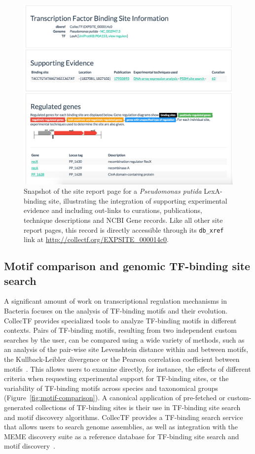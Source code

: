\begin{figure}
  \centering
  \includegraphics[width=\textwidth]{figures/chapter2/individual-site}
  \caption{Snapshot of the site report page for a \textit{Pseudomonas putida}
    LexA-binding site, illustrating the integration of supporting experimental
    evidence and including out-links to curations, publications, technique
    descriptions and NCBI Gene records. Like all other site report pages, this
    record is directly accessible through its \texttt{db\_xref} link at
    \url{http://collectf.org/EXPSITE_000014c0}.}
\label{fig:individual-site}
\end{figure}

\subsection{Motif comparison and genomic TF-binding site search}

A significant amount of work on transcriptional regulation mechanisms in
Bacteria focuses on the analysis of TF-binding motifs and their
evolution. CollecTF provides specialized tools to analyze TF-binding motifs in
different contexts. Pairs of TF-binding motifs, resulting from two independent
custom searches by the user, can be compared using a wide variety of methods,
such as an analysis of the pair-wise site Levenshtein distance within and
between motifs, the Kullback-Leibler divergence or the Pearson correlation
coefficient between motifs~\citep{vanet1999promoter, mahony2007stamp}. This
allows users to examine directly, for instance, the effects of different
criteria when requesting experimental support for TF-binding sites, or the
variability of TF-binding motifs across species and taxonomical groups
(Figure~\ref{fig:motif-comparison}). A canonical application of pre-fetched or
custom-generated collections of TF-binding sites is their use in TF-binding
site search and motif discovery algorithms. CollecTF provides a TF-binding
search service that allows users to search genome assemblies, as well as
integration with the MEME discovery suite as a reference database for
TF-binding site search and motif discovery~\citep{bailey2006meme}.

